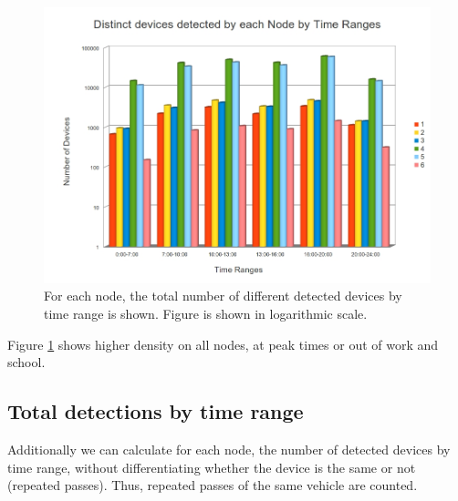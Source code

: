 \documentclass[preprint,authoryear,12pt]{elsarticle}
\begin{document}
 \begin{figure}[htb]
 \begin{center}
 \includegraphics[scale=0.4]{VehiculosDiferentesPorHoras.jpg}
 \caption{For each node, the total number of different detected devices by time range is shown. Figure is shown in logarithmic scale.
 \label{VehiculosDiferentesPorHoras}}
 \end{center}
 \end{figure}
 
Figure \ref{VehiculosDiferentesPorHoras} shows higher density on all nodes, at peak times or out of work and school.


\subsection{Total detections by time range}

Additionally we can calculate for each node, the number of detected devices by time range, without differentiating whether the device is the same or not (repeated passes). Thus, repeated passes of the same vehicle are counted.
\end{document}
